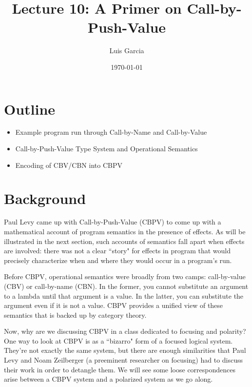 \documentclass{article}
\title{Lecture 10: A Primer on Call-by-Push-Value}
\author{Luis Garcia}
\date{\today}
\begin{document}
\maketitle

\section{Outline}
\begin{itemize}
    \item Example program run through Call-by-Name and Call-by-Value
    \item Call-by-Push-Value Type System and Operational Semantics
    \item Encoding of CBV/CBN into CBPV
\end{itemize}

\section{Background}
Paul Levy came up with Call-by-Push-Value (CBPV) to come up with a mathematical account of program semantics in the presence of effects. As will be illustrated in the next section, such accounts of semantics fall apart when effects are involved: there was not a clear ``story" for effects in program that would precisely characterize when and where they would occur in a program's run.

Before CBPV, operational semantics were broadly from two camps: call-by-value (CBV) or call-by-name (CBN). In the former, you cannot substitute an argument to a lambda until that argument is a value. In the latter, you can substitute the argument even if it is not a value. CBPV provides a unified view of these semantics that is backed up by category theory.

Now, why are we discussing CBPV in a class dedicated to focusing and polarity? One way to look at CBPV is as a ``bizarro" form of a focused logical system. They're not exactly the same system, but there are enough similarities that Paul Levy and Noam Zeilberger (a preeminent researcher on focusing) had to discuss their work in order to detangle them. We will see some loose correspondences arise between a CBPV system and a polarized system as we go along.
\end{document}
